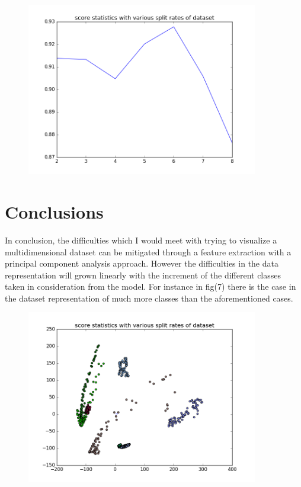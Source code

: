 \documentclass{article}
\begin{document}
\begin{center}
\begin{figure}
\caption{}
\label{fig:5}
\end{figure}
\begin{figure}
\centering
\includegraphics[width=0.9\textwidth]{multiple-classes-score}
\caption{}
\label{fig:6}
\end{figure}
\end{center}

\newpage
			\part{Conclusions}
				
			In conclusion, the difficulties which I would meet with trying to visualize a multidimensional dataset can be mitigated through a feature extraction with a principal component analysis approach.
			However the difficulties in the data representation will grown linearly with the increment of the different classes taken in consideration from the model. For instance in fig(7) there is the case in the dataset representation of much more classes than the aforementioned cases.
			
				
							\begin{center}
\begin{figure}
\centering
\includegraphics[width=0.9\textwidth]{multiple-classes-dataset}
\caption{}
\label{fig:7}
\end{figure}
\end{center}
		
\end{document}
